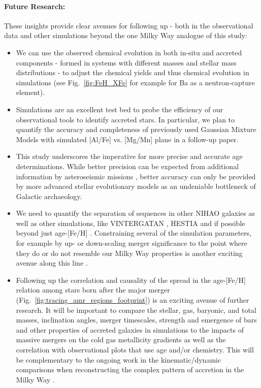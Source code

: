 \documentclass[fleqn,usenatbib]{mnras}
\begin{document}
\paragraph*{Future Research:}
These insights provide clear avenues for following up - both in the observational data and other simulations beyond the one Milky Way analogue of this study:
\begin{itemize}
    \item We can use the observed chemical evolution in both in-situ and accreted components - formed in systems with different masses and stellar mass distributions - to adjust the chemical yields and thus chemical evolution in simulations (see Fig.~\ref{fig:FeH_XFe} for example for Ba as a neutron-capture element).
    \item Simulations are an excellent test bed to probe the efficiency of our observational tools to identify accreted stars. In particular, we plan to quantify the accuracy and completeness of previously used Gaussian Mixture Models  \citep{Das2020, Buder2022} with simulated [Al/Fe] vs. [Mg/Mn] plane in a follow-up paper.
    \item This study underscores the imperative for more precise and accurate age determinations. While better precision can be expected from additional information by asteroseismic missions \citep[see e.g.][]{Miglio2017,Mackereth2021}, better accuracy can only be provided by more advanced stellar evolutionary models \citep[see also][]{Kim2002, Schuster2012} as an undeniable bottleneck of Galactic archaeology.
    \item We need to quantify the separation of sequences in other NIHAO galaxies \citep[see e.g.][]{Lu2022, Buck2023} as well as other simulations, like \textsc{VINTERGATAN} \citep{Renaud2021, Renaud2021b, Agertz2021}, \textsc{HESTIA} \citep{Khoperskov2023, Khoperskov2023b, Khoperskov2023c} and if possible beyond just age-[Fe/H] \citep{Khoperskov2023c}. Constraining several of the simulation parameters, for example by up- or down-scaling merger significance to the point where they do or do not resemble our Milky Way properties is another exciting avenue along this line \cite{Rey2023}.
    \item Following up the correlation and causality of the spread in the age-[Fe/H] relation among stars born after the major merger (Fig.~\ref{fig:tracing_amr_regions_footprint}) is an exciting avenue of further research. It will be important to compare the stellar, gas, baryonic, and total masses, inclination angles, merger timescales, strength and emergence of bars and other properties of accreted galaxies in simulations to the impacts of massive mergers on the cold gas metallicity gradients \citep{Buck2023} as well as the correlation with observational plots that use age and/or chemistry. This will be complementary to the ongoing work in the kinematic/dynamic comparisons \citep[e.g.][]{Naidu2021, Khoperskov2023b} when reconstructing the complex pattern of accretion in the Milky Way \citep{Naidu2020}.
\end{itemize}
\end{document}
